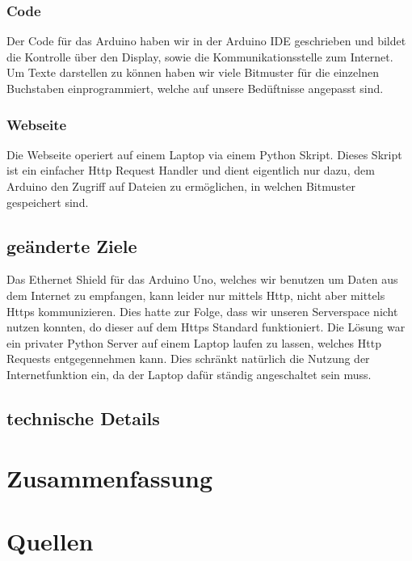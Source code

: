 \documentclass[10pt,a4paper]{article}
\begin{document}
\subsubsection{Code}

Der Code für das Arduino haben wir in der Arduino IDE geschrieben und bildet die Kontrolle über den Display, sowie die Kommunikationsstelle zum Internet.\\
Um Texte darstellen zu können haben wir viele Bitmuster für die einzelnen Buchstaben einprogrammiert, welche auf unsere Bedüftnisse angepasst sind.\\

\subsubsection{Webseite}

Die Webseite operiert auf einem Laptop via einem Python Skript. Dieses Skript ist ein einfacher Http Request Handler und dient eigentlich nur dazu, dem Arduino den Zugriff auf Dateien zu ermöglichen, in welchen Bitmuster gespeichert sind.\\

\subsection{geänderte Ziele}

Das Ethernet Shield für das Arduino Uno, welches wir benutzen um Daten aus dem Internet zu empfangen, kann leider nur mittels Http, nicht aber mittels Https kommunizieren. Dies hatte zur Folge, dass wir unseren Serverspace nicht nutzen konnten, do dieser auf dem Https Standard funktioniert. Die Lösung war ein privater Python Server auf einem Laptop laufen zu lassen, welches Http Requests entgegennehmen kann. Dies schränkt natürlich die Nutzung der Internetfunktion ein, da der Laptop dafür ständig angeschaltet sein muss.\\

\subsection{technische Details}

\section{Zusammenfassung}

\section{Quellen}
\end{document}
